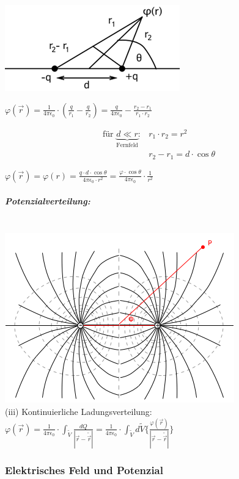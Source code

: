 \documentclass[11pt]{article}
\begin{document}
\includegraphics{skizzen/14/14_7B0}

$ \varphi(\vec{r})=\frac{1}{4\pi\epsilon_0}\cdot(\frac{q}{r_1}-\frac{q}{r_2})=\frac{q}{4\pi\epsilon_0}-\frac{r_2-r_1}{r_1\cdot r_2} $

\begin{align*}
	\text{für } \underbrace{d\ll r}_{\text{Fernfeld}}:& r_1\cdot r_2 = r^2\\
	&r_2-r_1=d\cdot\cos\theta
\end{align*}

$ \varphi(\vec{r})=\varphi(r)=\frac{q\cdot d\cdot \cos\theta}{4\pi\epsilon_0\cdot r^2} = \frac{\varphi\cdot\cos\theta}{4\pi\epsilon_0}\cdot\frac{1}{r^2} $

\subparagraph{Potenzialverteilung:}
\hfill\\
\includegraphics{skizzen/14/14_7B1}
\\
(iii) Kontinuierliche Ladungsverteilung:\\

$ \displaystyle\varphi(\vec{r})=\frac{1}{4\pi\epsilon_0}\cdot\int_{\tilde{V}} \frac{dQ}{|\vec{r}-\tilde{\vec{r}}|} = \frac{1}{4\pi\epsilon_0}\cdot\int_{\tilde{V}} d\tilde{V}\bigg\{\frac{\varphi(\vec{r})}{|\vec{r}-\tilde{\vec{r}}|}\bigg\}$\\

\subsubsection{Elektrisches Feld und Potenzial}
\end{document}
